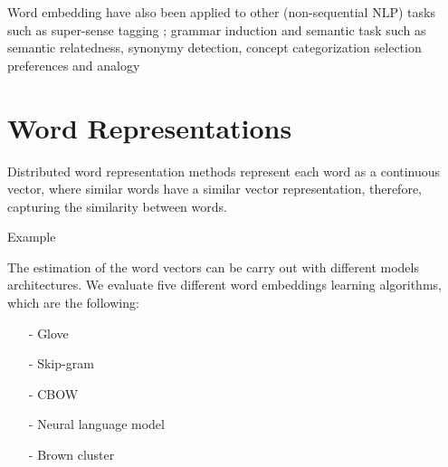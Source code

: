\documentclass[11pt]{article}
\begin{document}
Word embedding have also been applied to other (non-sequential NLP) tasks such as super-sense tagging \cite{Grave:2013}; grammar induction \cite{Spitkovsky:2011} and semantic task such as semantic relatedness, synonymy detection, concept categorization selection preferences and analogy \cite{baroni:2014}






\section{Word Representations}


Distributed word representation methods represent each word as a continuous vector, where similar words have a similar vector representation, therefore, capturing
the similarity between words.

{\color{red}Example}

The estimation of the word vectors can be carry out with different models architectures. We evaluate five different word embeddings learning algorithms, which are the following: 
 
\begin{itemize}
\item[-] Glove \cite{pennington2014glove}
\item[-] Skip-gram \cite{Mikolov13}
\item[-] CBOW \cite{Mikolov13}
\item[-] Neural language model \cite{turian2010word}
\item[-] Brown cluster \cite{Brown92class-basedn-gram}
\end{itemize}
\end{document}
